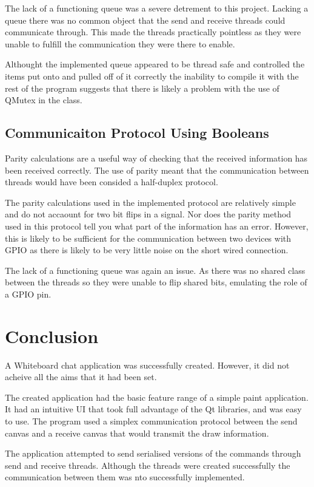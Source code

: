 \documentclass[10pt]{article}
\begin{document}
\begin{multicols*}{2}
The lack of a functioning queue was a severe detrement to this project. Lacking a queue there was no common object that the send and receive threads could communicate through. This made the threads practically pointless as they were unable to fulfill the communication they were there to enable.

Althought the implemented queue appeared to be thread safe and controlled the items put onto and pulled off of it correctly the inability to compile it with the rest of the program suggests that there is likely a problem with the use of QMutex in the class.

\subsection{Communicaiton Protocol Using Booleans}
Parity calculations are a useful way of checking that the received information has been received correctly. The use of parity meant that the communication between threads would have been consided a half-duplex protocol.

The parity calculations used in the implemented protocol are relatively simple and do not accaount for two bit flips in a signal. Nor does the parity method used in this protocol tell you what part of the information has an error. However, this is likely to be sufficient for the communication between two devices with GPIO as there is likely to be very little noise on the short wired connection.

The lack of a functioning queue was again an issue. As there was no shared class between the threads so they were unable to flip shared bits, emulating the role of a GPIO pin.

\section{Conclusion}
A Whiteboard chat application was successfully created. However, it did not acheive all the aims that it had been set.

The created application had the basic feature range of a simple paint application. It had an intuitive UI that took full advantage of the Qt libraries, and was easy to use. The program used a simplex communication protocol between the send canvas and a receive canvas that would transmit the draw information.

The application attempted to send serialised versions of the commands through send and receive threads. Although the threads were created successfully the communication between them was nto successfully implemented.


\end{multicols*}
\end{document}
